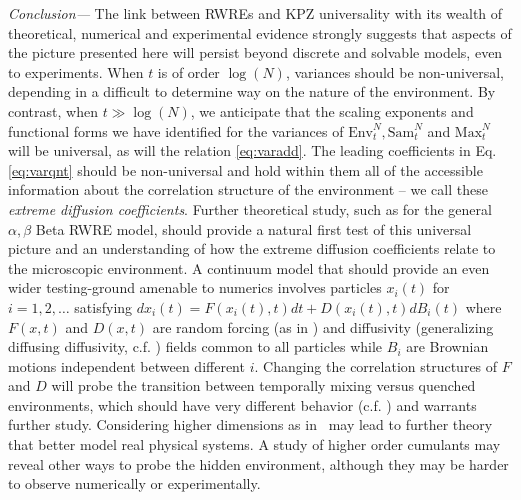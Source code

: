 \documentclass[%
 reprint,
 amsmath,amssymb,
 longbibliography,
 aps,
prl
]{revtex4-1}
\def\maxnt{\mathrm{Max}^{N}_t}
\def\envnt{\mathrm{Env}^{N}_t}
\def\snt{\mathrm{Sam}^{N}_t}
\begin{document}
\medskip\noindent\emph{Conclusion---}
The link between RWREs and KPZ universality with its wealth of theoretical, numerical and experimental evidence strongly suggests that aspects of the picture presented here will persist beyond discrete and solvable models, even to experiments. When $t$ is of order $\log(N)$, variances should be non-universal, depending in a difficult to determine way on the nature of the environment. By contrast, when $t\gg\log(N)$, we anticipate that the scaling exponents and functional forms we have identified for the variances of $\envnt,\snt$ and $\maxnt$ will be universal, as will the relation \eqref{eq:varadd}. The leading coefficients  in Eq. \eqref{eq:varqnt} should be non-universal and hold within them all of the accessible information about the correlation structure of the environment -- we call these {\it extreme diffusion coefficients}. Further theoretical study, such as for the general $\alpha,\beta$ Beta RWRE model, should provide a natural first test of this universal picture and an understanding of how the extreme diffusion coefficients relate to the microscopic environment. A continuum model that should provide an even wider testing-ground amenable to numerics involves particles $x_i(t)$ for $i=1,2,\ldots$ satisfying $dx_i(t) = F(x_i(t),t)dt + D(x_i(t),t) dB_i(t)$ where $F(x,t)$ and $D(x,t)$ are random forcing (as in \cite{ledoussalDiffusionTimedependentRandom2017}) and diffusivity (generalizing diffusing diffusivity, c.f. \cite{PhysRevX.7.021002}) fields common to all particles while $B_i$ are  Brownian motions independent between different $i$. Changing the correlation structures of $F$ and $D$ will probe the transition between temporally mixing versus quenched environments, which should have very different behavior (c.f. \cite{PhysRevLett.61.500,PhysRevLett.62.3097}) and warrants further study. Considering higher dimensions as in~\cite{ledoussalDiffusionTimedependentRandom2017} may lead to further theory that better model real physical systems. A study of higher order cumulants may reveal other ways to probe the hidden environment, although they may be harder to observe numerically or experimentally.
\end{document}

